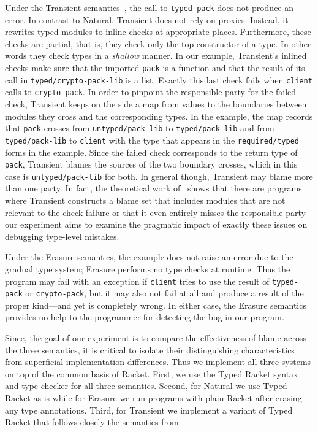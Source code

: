 Under the Transient semantics~\cite{vss-popl-2017}, the call to \texttt{typed-pack} does not
produce an error. In contrast to Natural, Transient does not rely on
proxies. Instead, it rewrites typed modules to inline checks at appropriate
places. Furthermore, these checks are
partial, that is, they check only the top constructor of a type. In other words
they check types in a  \emph{shallow} manner. In our
example, Transient's inlined checks make sure that the imported \texttt{pack} 
is a function and that the result of its call in \texttt{typed/crypto-pack-lib} is a list.   Exactly this
last check fails when \texttt{client} calls to \texttt{crypto-pack}. In
order to pinpoint the responsible party for the failed check, Transient
keeps on the side a map from values to the boundaries between modules they
cross and the corresponding types. In the example, the map records that
\texttt{pack} crosses from \texttt{untyped/pack-lib} to
\texttt{typed/pack-lib} and from \texttt{typed/pack-lib} to
\texttt{client} with the type that appears in the \texttt{required/typed}
forms in the example. Since the failed check corresponds to the return
type of \texttt{pack}, Transient blames the sources of the two
boundary crosses, which in this case is \texttt{untyped/pack-lib} for
both. In general though, Transient may blame more than one party. In
fact, the theoretical work of~\citet{gfd-oopsla-2019} shows that there
are programs where Transient constructs a blame set that includes
modules that are not relevant to the check failure or that it even
entirely misses the responsible party--our experiment aims to examine
the pragmatic impact of exactly these issues on debugging type-level
mistakes.

Under the Erasure semantics, the example does not raise an error due
to the gradual type system; Erasure performs no type checks at
runtime. Thus the program may fail with an exception if
\texttt{client} tries to use the result of \texttt{typed-pack} or
\texttt{crypto-pack}, but it may also not fail at all and produce a
result of the proper kind---and yet is completely wrong.  In either
case, the Erasure semantics provides no help to the programmer for
detecting the bug in our program.

Since, the goal of our experiment is to compare the effectiveness of blame
across the three semantics, it is critical to isolate their
distinguishing characteristics from superficial implementation
differences. Thus we implement all three systems on top of the common
basis of Racket. First, we use the Typed Racket syntax and type
checker for all three semantics. Second, for Natural we use Typed Racket as
is while for Erasure we run programs with plain Racket after erasing any
type annotations. Third, for Transient we implement a variant of Typed
Racket that follows closely the semantics from~\citet{vss-popl-2017}. 

